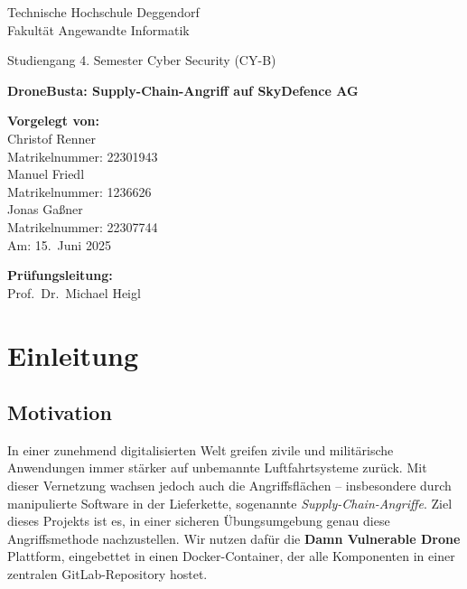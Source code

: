 \documentclass[a4paper,12pt]{report}
\newcommand{\faculty}{Fakultät Angewandte Informatik}
\newcommand{\studies}{4. Semester Cyber Security (CY-B)}
\newcommand{\thesistitleDE}{DroneBusta: Supply-Chain-Angriff auf SkyDefence AG}
\newcommand{\submissiondate}{15.\ Juni 2025}
\newcommand{\supervisor}{Prof.\ Dr.\ Michael Heigl}
\begin{document}
\begin{titlepage}
  \begin{center}
    {\Large Technische Hochschule Deggendorf\\
    \faculty\par}
    \vspace{0.2cm}
    {\Large Studiengang \studies\\}
    \vspace{2\baselineskip}
    {\Huge\bfseries \thesistitleDE\par}
    \vspace{3\baselineskip}
  \end{center}

  \vfill

  \parbox[t]{0.4\textwidth}{
    \textbf{Vorgelegt von:}\\[0.5em]
    Christof Renner\\
    Matrikelnummer: 22301943\\
    Manuel Friedl\\
    Matrikelnummer: 1236626\\
    Jonas Gaßner\\
    Matrikelnummer: 22307744\\[1em]
    Am: \submissiondate\par
  }
  \hfill
  \parbox[t]{0.4\textwidth}{
    \textbf{Prüfungsleitung:}\\[0.5em]
    \supervisor
  }
\end{titlepage}

\cleardoublepage
\tableofcontents
\cleardoublepage

\chapter{Einleitung}
\section{Motivation}
In einer zunehmend digitalisierten Welt greifen zivile und militärische Anwendungen immer stärker auf unbemannte Luftfahrtsysteme zurück. Mit dieser Vernetzung wachsen jedoch auch die Angriffsflächen – insbesondere durch manipulierte Software in der Lieferkette, sogenannte \emph{Supply-Chain-Angriffe}. Ziel dieses Projekts ist es, in einer sicheren Übungsumgebung genau diese Angriffsmethode nachzustellen. Wir nutzen dafür die \textbf{Damn Vulnerable Drone} Plattform, eingebettet in einen Docker-Container, der alle Komponenten in einer zentralen GitLab-Repository hostet.
\end{document}
